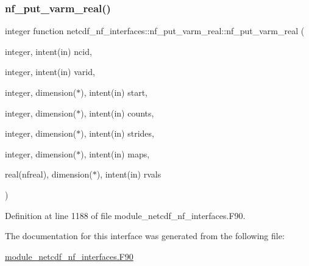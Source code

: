 \subsubsection{\texorpdfstring{nf\+\_\+put\+\_\+varm\+\_\+real()}{nf\_put\_varm\_real()}}
{\footnotesize\ttfamily integer function netcdf\+\_\+nf\+\_\+interfaces\+::nf\+\_\+put\+\_\+varm\+\_\+real\+::nf\+\_\+put\+\_\+varm\+\_\+real (\begin{DoxyParamCaption}\item[{integer, intent(in)}]{ncid,  }\item[{integer, intent(in)}]{varid,  }\item[{integer, dimension($\ast$), intent(in)}]{start,  }\item[{integer, dimension($\ast$), intent(in)}]{counts,  }\item[{integer, dimension($\ast$), intent(in)}]{strides,  }\item[{integer, dimension($\ast$), intent(in)}]{maps,  }\item[{real(nfreal), dimension($\ast$), intent(in)}]{rvals }\end{DoxyParamCaption})}



Definition at line 1188 of file module\+\_\+netcdf\+\_\+nf\+\_\+interfaces.\+F90.



The documentation for this interface was generated from the following file\+:\begin{DoxyCompactItemize}
\item 
\hyperlink{module__netcdf__nf__interfaces_8F90}{module\+\_\+netcdf\+\_\+nf\+\_\+interfaces.\+F90}\end{DoxyCompactItemize}
